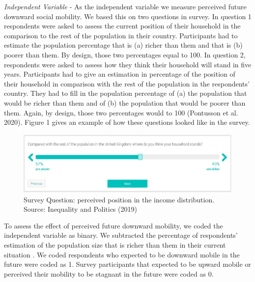 \documentclass[
  11pt,
]{article}
\begin{document}
\noindent\textit {Independent Variable} - As the independent variable we
measure perceived future downward social mobility. We based this on two
questions in survey. In question 1 respondents were asked to assess the
current position of their household in the comparison to the rest of the
population in their country. Participants had to estimate the population
percentage that is (a) richer than them and that is (b) poorer than
them. By design, those two percentages equal to 100. In question 2,
respondents were asked to assess how they think their household will
stand in five years. Participants had to give an estimation in
percentage of the position of their household in comparison with the
rest of the population in the respondents' country. They had to fill in
the population percentage of (a) the population that would be richer
than them and of (b) the population that would be poorer than them.
Again, by design, those two percentages would to 100 (Pontusson et al.
2020). Figure 1 gives an example of how these questions looked like in
the survey.

\begin{figure}
\centering
\includegraphics{"./variable_coding.jpeg"}
\caption{Survey Question: perceived position in the income distribution.
Source: Inequality and Politics (2019)}
\end{figure}

\noindent To assess the effect of perceived future downward mobility, we
coded the independent variable as binary. We subtracted the percentage
of respondents' estimation of the population size that is richer than
them in their current situation . We coded respondents who expected to
be downward mobile in the future were coded as 1. Survey participants
that expected to be upward mobile or perceived their mobility to be
stagnant in the future were coded as 0.

\vspace{0.4cm}
\end{document}
